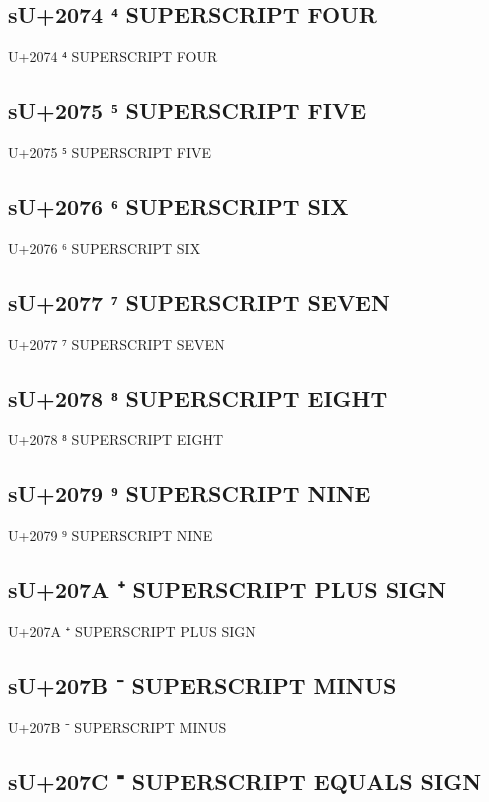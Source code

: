 \subsection{sU+2074 ⁴ SUPERSCRIPT FOUR}

U+2074 ⁴ SUPERSCRIPT FOUR

\subsection{sU+2075 ⁵ SUPERSCRIPT FIVE}

U+2075 ⁵ SUPERSCRIPT FIVE

\subsection{sU+2076 ⁶ SUPERSCRIPT SIX}

U+2076 ⁶ SUPERSCRIPT SIX

\subsection{sU+2077 ⁷ SUPERSCRIPT SEVEN}

U+2077 ⁷ SUPERSCRIPT SEVEN

\subsection{sU+2078 ⁸ SUPERSCRIPT EIGHT}

U+2078 ⁸ SUPERSCRIPT EIGHT

\subsection{sU+2079 ⁹ SUPERSCRIPT NINE}

U+2079 ⁹ SUPERSCRIPT NINE

\subsection{sU+207A ⁺ SUPERSCRIPT PLUS SIGN}

U+207A ⁺ SUPERSCRIPT PLUS SIGN

\subsection{sU+207B ⁻ SUPERSCRIPT MINUS}

U+207B ⁻ SUPERSCRIPT MINUS

\subsection{sU+207C ⁼ SUPERSCRIPT EQUALS SIGN}

